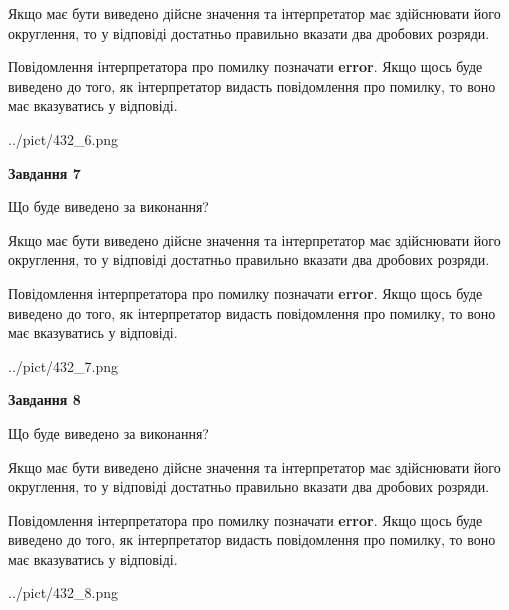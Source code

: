\documentclass[12pt, ukrainian]{article}
\begin{document}
{\begin {Large}
Якщо має бути виведено дійсне значення та інтерпретатор має здійснювати його округлення, 
то у відповіді достатньо правильно вказати два дробових розряди.

Повідомлення інтерпретатора про помилку позначати \textbf{error}.
Якщо щось буде виведено до того, як інтерпретатор видасть повідомлення про помилку, 
то воно має вказуватись у відповіді. \par

\begin{center}
	{../pict/432_6.png}
\end{center}
\newpage

{\begin {center}\textbf{Завдання 7}\end {center}}\par
Що буде виведено за виконання? \par

Якщо має бути виведено дійсне значення та інтерпретатор має здійснювати його округлення, 
то у відповіді достатньо правильно вказати два дробових розряди.

Повідомлення інтерпретатора про помилку позначати \textbf{error}.
Якщо щось буде виведено до того, як інтерпретатор видасть повідомлення про помилку, 
то воно має вказуватись у відповіді. \par

\begin{center}
	{../pict/432_7.png}
\end{center}
\newpage

{\begin {center}\textbf{Завдання 8}\end {center}}\par
Що буде виведено за виконання? \par

Якщо має бути виведено дійсне значення та інтерпретатор має здійснювати його округлення, 
то у відповіді достатньо правильно вказати два дробових розряди.

Повідомлення інтерпретатора про помилку позначати \textbf{error}.
Якщо щось буде виведено до того, як інтерпретатор видасть повідомлення про помилку, 
то воно має вказуватись у відповіді. \par

\begin{center}
	{../pict/432_8.png}
\end{center}
\newpage


\end{Large}}
\end{document}
